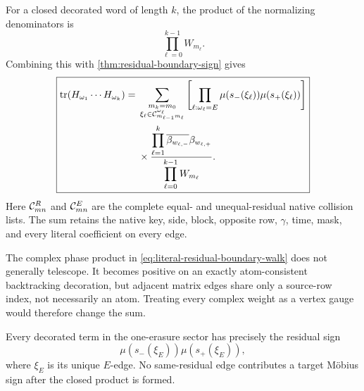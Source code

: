 For a closed decorated word of length \(k\), the product of the
normalizing denominators is
\[
 \prod_{\ell=0}^{k-1}W_{m_\ell}.
\]
Combining this with \cref{thm:residual-boundary-sign} gives
\begin{equation}
\boxed{
\begin{aligned}
\operatorname{tr}(H_{\omega_1}\cdots H_{\omega_k})
={}&
\sum_{\substack{m_k=m_0\\
                 \xi_\ell\in
                 \mathcal C^{\omega_\ell}_{m_{\ell-1}m_\ell}}}
\left[
\prod_{\ell:\omega_\ell=E}
\mu(s_-(\xi_\ell))\mu(s_+(\xi_\ell))
\right]
\\
&\times
\frac{
\displaystyle\prod_{\ell=1}^k
\overline{\beta_{w_{\ell,-}}}\beta_{w_{\ell,+}}
}{
\displaystyle\prod_{\ell=0}^{k-1}W_{m_\ell}
}.
\end{aligned}}
\label{eq:literal-residual-boundary-walk}
\end{equation}
Here
\(\mathcal C^R_{mn}\) and \(\mathcal C^E_{mn}\) are the complete equal- and
unequal-residual native collision lists.  The sum retains the native key,
side, block, opposite row, \(\gamma\), time, mask, and every literal
coefficient on every edge.

The complex phase product in
\eqref{eq:literal-residual-boundary-walk} does not generally telescope.
It becomes positive on an exactly atom-consistent backtracking decoration,
but adjacent matrix edges share only a source-row index, not necessarily
an atom.  Treating every complex weight as a vertex gauge would therefore
change the sum.

\begin{corollary}
\label{cor:one-erasure-sign}
Every decorated term in the one-erasure sector has precisely the residual
sign
\begin{equation}
 \mu(s_-(\xi_E))\mu(s_+(\xi_E)),
 \label{eq:one-erasure-sign}
\end{equation}
where \(\xi_E\) is its unique \(E\)-edge.  No same-residual edge contributes
a target Möbius sign after the closed product is formed.
\end{corollary}
